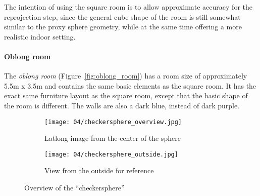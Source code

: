 
The intention of using the square room is to allow approximate accuracy for the reprojection step, since the general cube shape of the room is still somewhat similar to the proxy sphere geometry, while at the same time offering a more realistic indoor setting.

\paragraph{Oblong room}
The \emph{oblong room} (Figure~\ref{fig:oblong_room}) has a room size of approximately 5.5m x 3.5m and contains the same basic elements as the square room. It has the exact same furniture layout as the square room, except that the basic shape of the room is different. The walls are also a dark blue, instead of dark purple.


\begin{figure}[p]
\centering
    \hfill
    \begin{subfigure}[t]{0.7\textwidth}
            \centering
            \texttt{[image: 04/checkersphere\_overview.jpg]}
            \caption{Latlong image from the center of the sphere}
    \end{subfigure}%
    \hfill
    \begin{subfigure}[t]{0.3\textwidth}
            \centering
            \texttt{[image: 04/checkersphere\_outside.jpg]}
            \caption{View from the outside for reference}
    \end{subfigure}
    \hfill
  \caption{Overview of the ``checkersphere''}
  \label{fig:checkersphere}
\end{figure}

